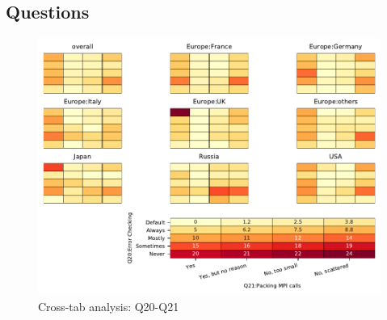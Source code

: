 
\subsection{Questions}


\begin{figure}
\begin{center}
\includegraphics[width=12cm]{../pdfs/Q20-Q21.pdf}
\caption{Cross-tab analysis: Q20-Q21}
\label{fig:Q20-Q21}
\end{center}
\end{figure}
